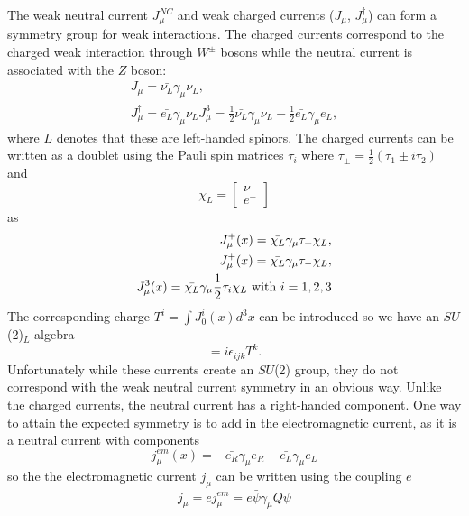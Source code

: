 The weak neutral current $J_\mu^{NC}$ and weak charged currents ($J_\mu$, $J_\mu^\dagger$) can form a symmetry group for weak interactions. The charged currents correspond to the charged weak interaction through $W^\pm$ bosons while the neutral current is associated with the $Z$ boson:
\begin{equation}
\begin{split}
J_\mu=\bar{\nu_L}\gamma_\mu\nu_L, \\
J_\mu^\dagger =\bar{e_L}\gamma_\mu\nu_L
J_\mu^3=\frac{1}{2}\bar{\nu_L}\gamma_\mu\nu_L-\frac{1}{2}\bar{e_L}\gamma_\mu e_L,
\end{split}
\end{equation}
where $L$ denotes that these are left-handed spinors. The charged currents can be written as a doublet using the Pauli spin matrices $\tau_i$ where $\tau_\pm=\frac{1}{2}(\tau_1\pm i\tau_2)$ and
\begin{equation}
\chi_L=\begin{bmatrix}
        \nu  \\
        e^-
        \end{bmatrix}
\end{equation}
as 
\begin{equation}
\begin{split}
J_\mu^+(x)=\bar{\chi_L}\gamma_\mu\tau_+\chi_L, \\
J_\mu^+(x)=\bar{\chi_L}\gamma_\mu\tau_-\chi_L, \\
J_\mu^3(x)=\bar{\chi_L}\gamma_\mu\frac{1}{2}\tau_i\chi_L \textnormal{ with } i=1,2,3
\end{split}
\end{equation}
The corresponding charge $T^i=\int J_0^i(x)d^3x$ can be introduced so we have an $SU$(2)$_L$ algebra
\begin{equation}
[T^i,T^j]=i\epsilon_{ijk}T^k.
\end{equation}
Unfortunately while these currents create an $SU$(2) group, they do not correspond with the weak neutral current symmetry in an obvious way. Unlike the charged currents, the neutral current has a right-handed component. One way to attain the expected symmetry is to add in the electromagnetic current, as it is a neutral current with components
\begin{equation} 
j_\mu^{em}(x)=-\bar{e_R}\gamma_\mu e_R-\bar{e_L}\gamma_\mu e_L
\end{equation}
so the the electromagnetic current $j_\mu$ can be written using the coupling $e$
\begin{equation}
j_\mu=e j_\mu^{em} = e\bar{\psi}\gamma_\mu Q\psi
\end{equation}
